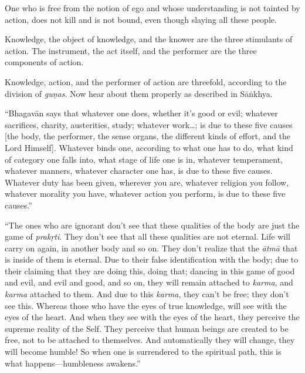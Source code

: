 {One who is free from the notion of ego and whose understanding is not tainted by action, does not kill and is not bound, even though slaying all these people.}

{Knowledge, the object of knowledge, and the knower are the three stimulants of action. The instrument, the act itself, and the performer are the three components of action.}

{Knowledge, action, and the performer of action are threefold, according to the division of \textit{guṇas}. Now hear about them properly as described in Sāṅkhya.}

\enquote{Bhagavān says that whatever one does, whether it’s good or evil; whatever sacrifices, charity, austerities, study; whatever work\ldots; is due to these five causes [the body, the performer, the sense organs, the different kinds of effort, and the Lord Himself]. Whatever binds one, according to what one has to do, what kind of category one falls into, what stage of life one is in, whatever temperament, whatever manners, whatever character one has, is due to these five causes. Whatever duty has been given, wherever you are, whatever religion you follow, whatever morality you have, whatever action you perform, is due to these five causes.}

\enquote{The ones who are ignorant don’t see that these qualities of the body are just the game of \textit{prakṛti}. They don’t see that all these qualities are not eternal. Life will carry on again, in another body and so on. They don’t realize that the \textit{ātmā} that is inside of them is eternal. Due to their false identification with the body; due to their claiming that they are doing this, doing that; dancing in this game of good and evil, and evil and good, and so on, they will remain attached to \textit{karma}, and \textit{karma} attached to them. And due to this \textit{karma}, they can’t be free; they don’t see this. Whereas those who have the eyes of true knowledge, will see with the eyes of the heart. And when they see with the eyes of the heart, they perceive the supreme reality of the Self. They perceive that human beings are created to be free, not to be attached to themselves. And automatically they will change, they will become humble! So when one is surrendered to the spiritual path, this is what happens---humbleness awakens.}

